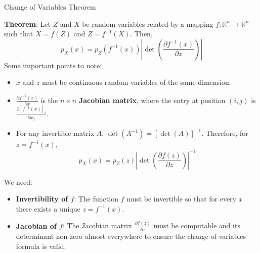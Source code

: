 \begin{frame}[allowframebreaks]{Change of Variables Theorem}
\framebreak

\textbf{Theorem}: Let $Z$ and $X$ be random variables related by a mapping $f:\mathbb{R}^n \rightarrow \mathbb{R}^n$ such that $X = f(Z)$ and $Z = f^{-1}(X)$. Then,
\[
p_X(x) = p_Z(f^{-1}(x)) \left| \det \left( \frac{\partial f^{-1}(x)}{\partial x} \right) \right|
\]
Some important points to note:
\begin{itemize}
    \item $x$ and $z$ must be continuous random variables of the same dimension.
    \item $\frac{\partial f^{-1}(x)}{\partial x}$ is the $n \times n$ \textbf{Jacobian matrix}, where the entry at position $(i, j)$ is $\frac{\partial [f^{-1}(x)]_i}{\partial x_j}$.
    \item For any invertible matrix $A$, $\det(A^{-1}) = [\det(A)]^{-1}$. Therefore, for $z = f^{-1}(x)$,
    \[
    p_X(x) = p_Z(z) \left| \det \left( \frac{\partial f(z)}{\partial z} \right) \right|^{-1}
    \]
\end{itemize}

\framebreak

\large We need:
\begin{itemize}
    \item \textbf{Invertibility of $f$}: The function $f$ must be invertible so that for every $x$ there exists a unique $z = f^{-1}(x)$.
    \item \textbf{Jacobian of $f$}: The Jacobian matrix $\frac{\partial f(z)}{\partial z}$ must be computable and its determinant non-zero almost everywhere to ensure the change of variables formula is valid.
\end{itemize}

\end{frame}